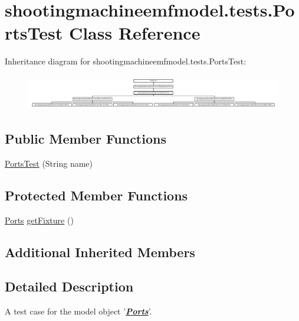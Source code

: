 \hypertarget{classshootingmachineemfmodel_1_1tests_1_1_ports_test}{\section{shootingmachineemfmodel.\-tests.\-Ports\-Test Class Reference}
\label{classshootingmachineemfmodel_1_1tests_1_1_ports_test}
}
Inheritance diagram for shootingmachineemfmodel.\-tests.\-Ports\-Test\-:\begin{figure}[H]
\begin{center}
\leavevmode
\includegraphics[height=1.540154cm]{classshootingmachineemfmodel_1_1tests_1_1_ports_test}
\end{center}
\end{figure}
\subsection*{Public Member Functions}
\begin{DoxyCompactItemize}
\item 
\hyperlink{classshootingmachineemfmodel_1_1tests_1_1_ports_test_a33e451eb7a30c1f836d1b1943f3ef9aa}{Ports\-Test} (String name)
\end{DoxyCompactItemize}
\subsection*{Protected Member Functions}
\begin{DoxyCompactItemize}
\item 
\hyperlink{interfaceshootingmachineemfmodel_1_1_ports}{Ports} \hyperlink{classshootingmachineemfmodel_1_1tests_1_1_ports_test_a77b6d240eddf546ca5e39490515de325}{get\-Fixture} ()
\end{DoxyCompactItemize}
\subsection*{Additional Inherited Members}


\subsection{Detailed Description}
A test case for the model object '{\itshape {\bfseries \hyperlink{interfaceshootingmachineemfmodel_1_1_ports}{Ports}}}'.

